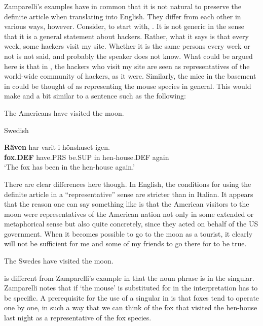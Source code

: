\z

Zamparelli’s examples have in common that it is not natural to preserve the definite article when translating into English. They differ from each other in various ways, however. Consider, to start with, . It is not generic in the sense that it is a general statement about hackers. Rather, what it says is that every week, some hackers visit my site. Whether it is the same persons every week or not is not said, and probably the speaker does not know. What could be argued here is that in , the hackers who visit my site are seen as representatives of the world-wide community of hackers, as it were. Similarly, the mice in the basement in  could be thought of as representing the mouse species in general. This would make  and  a bit similar to a sentence such as the following: 

\ea
	\gl \label{bkm:Ref69031158}The Americans have visited the moon.  
\z

\ea 
\gl \label{bkm:Ref77501116}Swedish
\z
 
\ea\label{}
\gll \textbf{Räven} har  varit  i  hönshuset  igen.\\
\textbf{fox.DEF} have.PRS  be.SUP  in  hen-house.DEF  again\\
\glt ‘The fox has been in the hen-house again.’

\z

There are clear differences here though. In English, the conditions for using the definite article in a “representative” sense are stricter than in Italian. It appears that the reason one can say something like  is that the American visitors to the moon were representatives of the American nation not only in some extended or metaphorical sense but also quite concretely, since they acted on behalf of the US government. When it becomes possible to go to the moon as a tourist, it clearly will not be sufficient for me and some of my friends to go there for  to be true.

\ea
\gl \label{bkm:Ref94431191}The Swedes have visited the moon.  
 \z

	  is different from Zamparelli’s example in that the noun phrase is in the singular. Zamparelli notes that if  ‘the mouse’ is substituted for in \textstyleLinguisticExample{, }the interpretation has to be specific. A prerequisite for the use of a singular in  is that foxes tend to operate one by one, in such a way that we can think of the fox that visited the hen-house last night as a representative of the fox species. 

